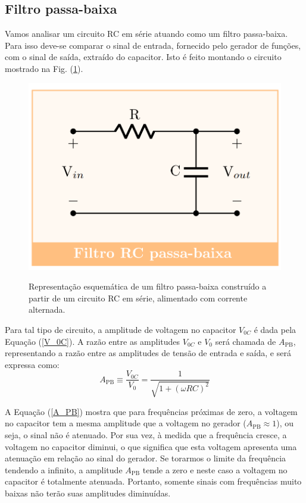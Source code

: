\documentclass[letterpaper, 12pt]{article}
\begin{document}
\subsection{Filtro passa-baixa}
Vamos analisar um circuito RC em série atuando como um filtro passa-baixa. Para isso deve-se comparar o sinal de entrada, fornecido pelo gerador de funções, com o sinal de saída, extraído do capacitor. Isto é feito montando o circuito mostrado na Fig. (\ref{fig:Low-pass_RC_Filter}).
\begin{figure}[h]
    \centering
    \includegraphics[width=0.5\linewidth]{figures/Low-pass_RC_Filter.png}
    \label{fig:Low-pass_RC_Filter}
    \caption{Representação esquemática de um filtro passa-baixa construído a partir de um circuito RC em série, alimentado com corrente alternada.}
\end{figure}

Para tal tipo de circuito, a amplitude de voltagem no capacitor $V_{0C}$ é dada pela Equação (\ref{V_0C}). A razão entre as amplitudes $V_{0C}$ e $V_{0}$ será chamada de $A_{\text{PB}}$, representando a razão entre as amplitudes de tensão de entrada e saída, e será expressa como:
\begin{equation}\label{A_PB}
    A_{\text{PB}}\equiv\frac{V_{0C}}{V_{0}}=\frac{1}{\sqrt{1+(\omega RC)^{2}}}
\end{equation}

A Equação (\ref{A_PB}) mostra que para frequências próximas de zero, a voltagem no capacitor tem a mesma amplitude que a voltagem no gerador ($A_{\text{PB}}\approx1$), ou seja, o sinal não é atenuado. Por sua vez, à medida que a frequência cresce, a voltagem no capacitor diminui, o que significa que esta voltagem apresenta uma atenuação em relação ao sinal do gerador. Se torarmos o limite da frequência tendendo a infinito, a amplitude $A_{\text{PB}}$ tende a zero e neste caso a voltagem no capacitor é totalmente atenuada. Portanto, somente sinais com frequências muito baixas não terão suas amplitudes diminuídas.
\end{document}
